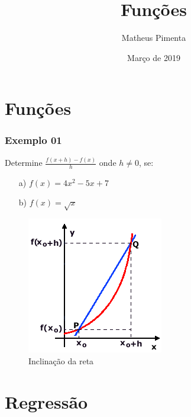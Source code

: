 \documentclass[hyperref={pdfpagelabels=false}]{beamer}
\title{Funções}
\author[Matheus Pimenta]{Matheus Pimenta}
\institute[UTFPR-CP]{\normalsize Universidade Tecnológica Federal do Paraná \\
	Câmpus Cornélio Procópio
}
\date{Março de 2019}
\begin{document}
	
\begin{frame}
\titlepage
\end{frame} 




\section{Funções} 


\begin{frame}
\frametitle{Exemplo 01} 

Determine $\frac{f(x+h)-f(x)}{h}$ onde $h \neq 0$, se:
\begin{enumerate}
	\item [a)] $f(x) = 4x^2-5x+7$
	\pause
	\item [b)] $f(x) = \sqrt{x}$
\end{enumerate}

\pause 

\begin{figure}[!htb]
	\centering
	\includegraphics[scale=0.5]{inc.png}
	\caption{Inclinação da reta}
\end{figure}

\end{frame}

\section{Regressão}
\end{document}

